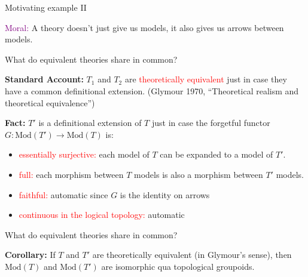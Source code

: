 \documentclass[8pt]{beamer}
\begin{document}
\begin{frame}{Motivating example II}

\begin{figure}
\end{figure}


\bigskip \textcolor{purple}{Moral:} A theory doesn't just give us
models, it also gives us arrows between models.

\end{frame}

\begin{frame}{What do equivalent theories share in common?}


  \textbf{Standard Account:} $T_1$ and $T_2$ are
  \textcolor{red}{theoretically equivalent} just in case they have a
  common definitional extension.  (Glymour 1970, ``Theoretical realism
  and theoretical equivalence'')

  \bigskip \textbf{Fact:} $T'$ is a definitional extension of $T$ just
  in case the forgetful functor $G:\mathrm{Mod}(T')\to\mathrm{Mod}(T)$
  is:
\begin{itemize}
\item \textcolor{red}{essentially surjective:} each model of $T$ can be expanded to a
  model of $T'$.
\item \textcolor{red}{full:} each morphism between $T$ models is also a morphism
  between $T'$ models.
\item \textcolor{red}{faithful:} automatic since $G$ is the identity on arrows
\item \textcolor{red}{continuous in the logical topology:} automatic
\end{itemize}
\end{frame}


\begin{frame}{What do equivalent theories share in common?}

  \textbf{Corollary:} If $T$ and $T'$ are theoretically equivalent (in
  Glymour's sense), then $\mathrm{Mod}(T)$ and $\mathrm{Mod}(T')$ are
  isomorphic qua topological groupoids.


\end{frame}
\end{document}
